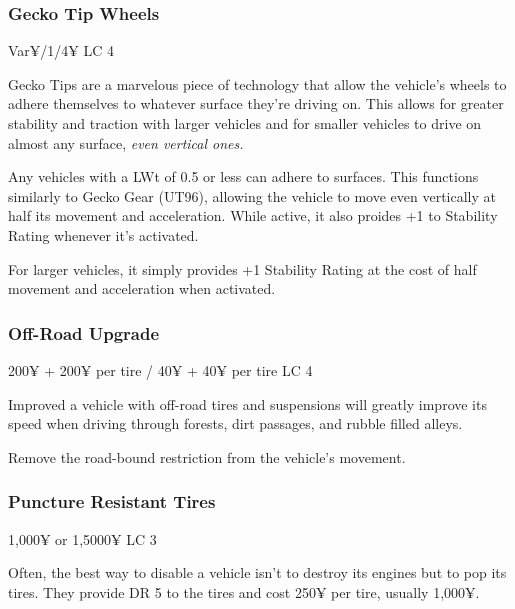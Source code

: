 \begin{multicols*}{2}
	\subsubsection{Gecko Tip Wheels}
	Var¥/1/4¥ LC 4
	
	Gecko Tips are a marvelous piece of technology that allow the vehicle's wheels to adhere themselves to whatever surface they're driving on. This allows for greater stability and traction with larger vehicles and for smaller vehicles to drive on almost any surface, \textit{even vertical ones.}
	
	Any vehicles with a LWt of 0.5 or less can adhere to surfaces. This functions similarly to Gecko Gear (UT96), allowing the vehicle to move even vertically at half its movement and acceleration. While active, it also proides +1 to Stability Rating whenever it's activated.
	
	For larger vehicles, it simply provides +1 Stability Rating at the cost of half movement and acceleration when activated.
	

	\subsubsection{Off-Road Upgrade}
	200¥ + 200¥ per tire / 40¥ + 40¥ per tire LC 4
	
	Improved a vehicle with off-road tires and suspensions will greatly improve its speed when driving through forests, dirt passages, and rubble filled alleys.
	
	Remove the road-bound restriction from the vehicle's movement.
	
	\subsubsection{Puncture Resistant Tires}
	1,000¥ or 1,5000¥ LC 3
	
	Often, the best way to disable a vehicle isn't to destroy its engines but to pop its tires. They provide DR 5 to the tires and cost 250¥ per tire, usually 1,000¥.
	

\end{multicols*}
